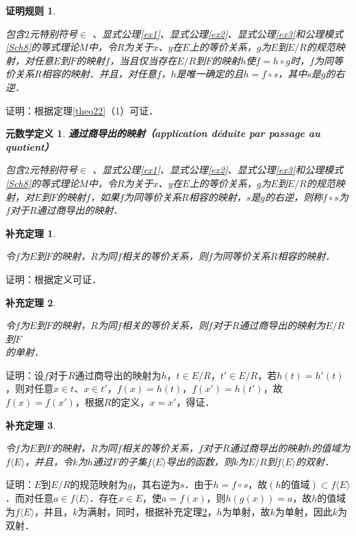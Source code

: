 \documentclass[12pt, a4paper, oneside]{book}
\newtheorem{metadef}{元数学定义}
\newtheorem{C}{证明规则}
\newtheorem{cor}{补充定理}
\begin{document}
			\begin{C}\label{C57}
				\hfill\par
				包含$2$元特别符号$\in$ 、显式公理\ref{ex1}、显式公理\ref{ex2}、显式公理\ref{ex3}和公理模式\ref{Sch8}的等式理论$M$中，令$R$为关于$x$、$y$在$E$上的等价关系，$g$为$E$到$E/R$的规范映射，对任意$E$到$F$的映射$f$，当且仅当存在$E/R$到$F$的映射$h$使$f=h\circ g$时，$f$为同等价关系$R$相容的映射．并且，对任意$f$，$h$是唯一确定的且$h=f\circ s$，其中$s$是$g$的右逆．
			\end{C}
			证明：根据定理\ref{theo22}（1）可证．

			\begin{metadef}
				\textbf{通过商导出的映射（application déduite par passage au quotient）}
				\par
				包含$2$元特别符号$\in$ 、显式公理\ref{ex1}、显式公理\ref{ex2}、显式公理\ref{ex3}和公理模式\ref{Sch8}的等式理论$M$中，令$R$为关于$x$、$y$在$E$上的等价关系，$g$为$E$到$E/R$的规范映射，对$E$到$F$的映射$f$，如果$f$为同等价关系$R$相容的映射，$s$是$g$的右逆，则称$f\circ s$为$f$对于$R$通过商导出的映射．
			\end{metadef}

			\begin{cor}\label{cor149}
				\hfill\par
				令$f$为$E$到$F$的映射，$R$为同$f$相关的等价关系，则$f$为同等价关系$R$相容的映射．
			\end{cor}
			证明：根据定义可证．

			\begin{cor}\label{cor150}
				\hfill\par
				令$f$为$E$到$F$的映射，$R$为同$f$相关的等价关系，则$f$对于$R$通过商导出的映射为$E/R$到$F$\\的单射．
			\end{cor}
			证明：设$f$对于$R$通过商导出的映射为$h$，$t\in E/R$，$t'\in E/R$，若$h(t)=h'(t)$，则对任意$x\in t$、$x\in t'$，$f(x)=h(t)$，$f(x')=h(t')$，故$f(x)=f(x')$，根据$R$的定义，$x=x'$，得证．

			\begin{cor}\label{cor151}
				\hfill\par
				令$f$为$E$到$F$的映射，$R$为同$f$相关的等价关系，$f$对于$R$通过商导出的映射$h$的值域为\\$f\langle E \rangle $，并且，令$k$为$h$通过$F$的子集$f\langle E \rangle $导出的函数，则$k$为$E/R$到$f\langle E \rangle $的双射．
			\end{cor}
			证明：$E$到$E/R$的规范映射为$g$，其右逆为$s$．由于$h=f\circ s$，故$(h\text{的值域})\subset f\langle E \rangle $．而对任意$a\in f\langle E \rangle $．存在$x\in E$，使$a=f(x)$，则$h(g(x))=a$，故$h$的值域为$f\langle E \rangle $，并且，$k$为满射，同时，根据补充定理\ref{cor150}，$h$为单射，故$k$为单射，因此$k$为双射．
			
\end{document}
